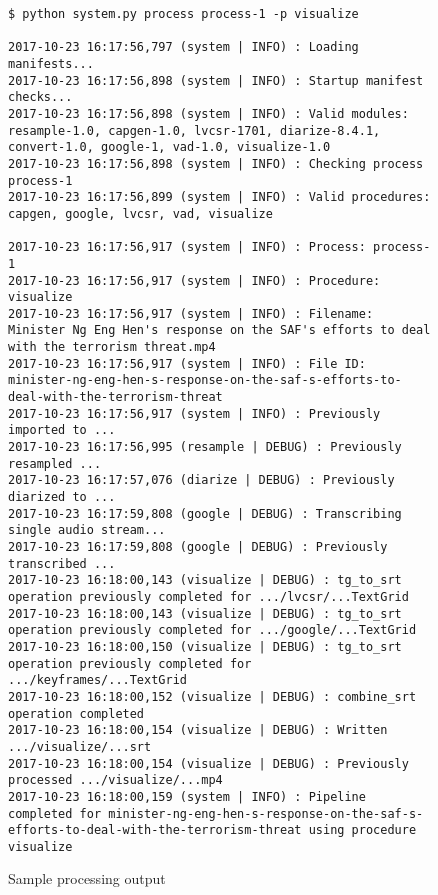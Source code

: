 \begin{figure}[ht]
\begin{lstlisting}
$ python system.py process process-1 -p visualize

2017-10-23 16:17:56,797 (system | INFO) : Loading manifests...
2017-10-23 16:17:56,898 (system | INFO) : Startup manifest checks...
2017-10-23 16:17:56,898 (system | INFO) : Valid modules: resample-1.0, capgen-1.0, lvcsr-1701, diarize-8.4.1, convert-1.0, google-1, vad-1.0, visualize-1.0
2017-10-23 16:17:56,898 (system | INFO) : Checking process process-1
2017-10-23 16:17:56,899 (system | INFO) : Valid procedures: capgen, google, lvcsr, vad, visualize

2017-10-23 16:17:56,917 (system | INFO) : Process: process-1
2017-10-23 16:17:56,917 (system | INFO) : Procedure: visualize
2017-10-23 16:17:56,917 (system | INFO) : Filename: Minister Ng Eng Hen's response on the SAF's efforts to deal with the terrorism threat.mp4
2017-10-23 16:17:56,917 (system | INFO) : File ID: minister-ng-eng-hen-s-response-on-the-saf-s-efforts-to-deal-with-the-terrorism-threat
2017-10-23 16:17:56,917 (system | INFO) : Previously imported to ...
2017-10-23 16:17:56,995 (resample | DEBUG) : Previously resampled ...
2017-10-23 16:17:57,076 (diarize | DEBUG) : Previously diarized to ...
2017-10-23 16:17:59,808 (google | DEBUG) : Transcribing single audio stream...
2017-10-23 16:17:59,808 (google | DEBUG) : Previously transcribed ...
2017-10-23 16:18:00,143 (visualize | DEBUG) : tg_to_srt operation previously completed for .../lvcsr/...TextGrid
2017-10-23 16:18:00,143 (visualize | DEBUG) : tg_to_srt operation previously completed for .../google/...TextGrid
2017-10-23 16:18:00,150 (visualize | DEBUG) : tg_to_srt operation previously completed for .../keyframes/...TextGrid
2017-10-23 16:18:00,152 (visualize | DEBUG) : combine_srt operation completed
2017-10-23 16:18:00,154 (visualize | DEBUG) : Written .../visualize/...srt
2017-10-23 16:18:00,154 (visualize | DEBUG) : Previously processed .../visualize/...mp4
2017-10-23 16:18:00,159 (system | INFO) : Pipeline completed for minister-ng-eng-hen-s-response-on-the-saf-s-efforts-to-deal-with-the-terrorism-threat using procedure visualize
\end{lstlisting}
\caption{Sample processing output}\label{eval-vid}
\end{figure}
